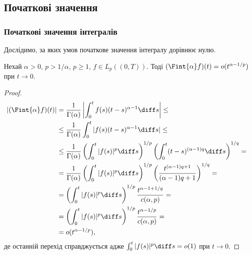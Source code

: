 \subsection{Початкові значення}

\subsubsection{Початкові значення інтегралів}

Дослідимо, за яких умов початкове значення інтегралу %
дорівнює нулю.

\begin{theorem}
    Нехай $\alpha > 0$, $p > 1 / \alpha$, $p \ge 1$, $f \in L_p((0, T))$. Тоді $(\Fint{\alpha} f) (t) = o(t^{\alpha - 1 / p})$ при $t \to 0$.
\end{theorem}

\begin{proof}
    \begin{equation}
        \begin{aligned}
            | (\Fint{\alpha} f) (t) | &= \frac{1}{\Gamma(\alpha)} \left| \int_0^t f(s) (t - s)^{\alpha - 1} \diff s \right| \le \\
            &\le \frac{1}{\Gamma(\alpha)}  \int_0^t | f(s) (t - s)^{\alpha - 1} \diff s | \le \\
            &\le \frac{1}{\Gamma(\alpha)} \left( \int_0^t |f(s)|^p \diff s \right)^{1/p} \left( \int_0^t (t - s)^{(\alpha - 1) q} \diff s \right)^{1/q} = \\
            &= \frac{1}{\Gamma(\alpha)} \left( \int_0^t |f(s)|^p \diff s \right)^{1/p} \left( \frac{t^{(\alpha - 1) q + 1}}{(\alpha - 1) q + 1} \right)^{1 / q} = \\
            &= \left( \int_0^t |f(s)|^p \diff s \right)^{1/p} \frac{t^{\alpha - 1 + 1 / q}}{c(\alpha, p)} = \\
            &= \left( \int_0^t |f(s)|^p \diff s \right)^{1/p} \frac{t^{\alpha - 1 / p}}{c(\alpha, p)} = \\
            &= o(t^{\alpha - 1 / p}),
        \end{aligned}
    \end{equation}
    де останній перехід справджується адже $\int_0^t |f(s)|^p \diff s = o(1)$ при $t \to 0$.
\end{proof}

